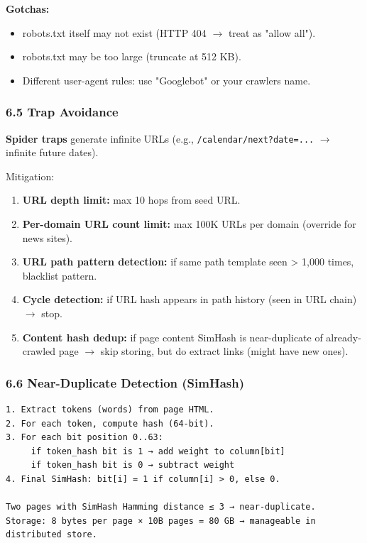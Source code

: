 \documentclass[11pt]{article}
\providecommand{\tightlist}{\setlength{\itemsep}{1pt}\setlength{\parskip}{0pt}}
\begin{document}
\textbf{Gotchas:}

\begin{itemize}
\tightlist
\item
  robots.txt itself may not exist (HTTP 404 \(\rightarrow\) treat as "allow all").
\item
  robots.txt may be too large (truncate at 512 KB).
\item
  Different user-agent rules: use "Googlebot" or your crawler\textquotesingle s name.
\end{itemize}

\subsubsection{6.5 Trap Avoidance}\label{65-trap-avoidance}

\textbf{Spider traps} generate infinite URLs (e.g., \texttt{/calendar/next?date=...} \(\rightarrow\) infinite future dates).

Mitigation:

\begin{enumerate}
\def\labelenumi{\arabic{enumi}.}
\tightlist
\item
  \textbf{URL depth limit:} max 10 hops from seed URL.
\item
  \textbf{Per-domain URL count limit:} max 100K URLs per domain (override for news sites).
\item
  \textbf{URL path pattern detection:} if same path template seen \textgreater{} 1,000 times, blacklist pattern.
\item
  \textbf{Cycle detection:} if URL hash appears in path history (seen in URL chain) \(\rightarrow\) stop.
\item
  \textbf{Content hash dedup:} if page content SimHash is near-duplicate of already-crawled page \(\rightarrow\) skip storing, but do extract links (might have new ones).
\end{enumerate}

\subsubsection{6.6 Near-Duplicate Detection (SimHash)}\label{66-near-duplicate-detection-simhash}

\setcodelang{}

\begin{verbatim}
1. Extract tokens (words) from page HTML.
2. For each token, compute hash (64-bit).
3. For each bit position 0..63:
     if token_hash bit is 1 → add weight to column[bit]
     if token_hash bit is 0 → subtract weight
4. Final SimHash: bit[i] = 1 if column[i] > 0, else 0.

Two pages with SimHash Hamming distance ≤ 3 → near-duplicate.
Storage: 8 bytes per page × 10B pages = 80 GB → manageable in distributed store.
\end{verbatim}
\end{document}
